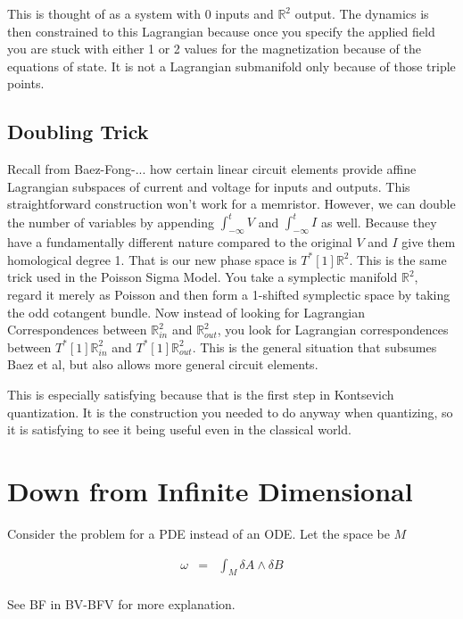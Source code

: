 \documentclass[a4paper,landscape]{article}
\theoremstyle{change}
\theoremstyle{nonumberplain}
\numberwithin{equation}{section}
\begin{document}
This is thought of as a system with 0 inputs and $\mathbb{R}^2$ output. The dynamics is then constrained to this Lagrangian because once you specify the applied field you are stuck with either 1 or 2 values for the magnetization because of the equations of state. It is not a Lagrangian submanifold only because of those triple points.

\subsection{Doubling Trick}

Recall from Baez-Fong-... how certain linear circuit elements provide affine Lagrangian subspaces of current and voltage for inputs and outputs. This straightforward construction won't work for a memristor. However, we can double the number of variables by appending $\int_{-\infty}^t V$ and $\int_{-\infty}^t I$ as well. Because they have a fundamentally different nature compared to the original $V$ and $I$ give them homological degree 1. That is our new phase space is $T^* [1] \mathbb{R}^2$. This is the same trick used in the Poisson Sigma Model. You take a symplectic manifold $\mathbb{R}^2$, regard it merely as Poisson and then form a 1-shifted symplectic space by taking the odd cotangent bundle. Now instead of looking for Lagrangian Correspondences between $\mathbb{R}^2_{in}$ and $\mathbb{R}^2_{out}$, you look for Lagrangian correspondences between $T^*[1] \mathbb{R}^2_{in}$ and $T^* [1] \mathbb{R}^2_{out}$. This is the general situation that subsumes Baez et al, but also allows more general circuit elements.

This is especially satisfying because that is the first step in Kontsevich quantization. It is the construction you needed to do anyway when quantizing, so it is satisfying to see it being useful even in the classical world.

\section{Down from Infinite Dimensional}

Consider the problem for a PDE instead of an ODE. Let the space be $M$

\begin{eqnarray*}
\omega &=& \int_M \delta A \wedge \delta B\\
\end{eqnarray*}

See BF in BV-BFV for more explanation.
\end{document}
